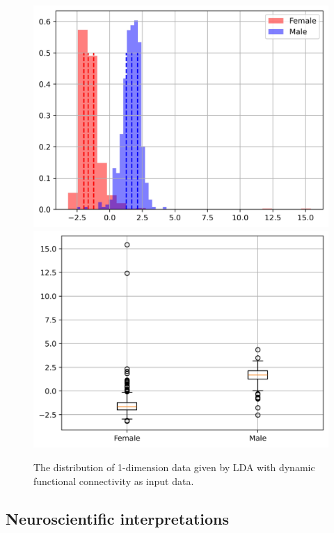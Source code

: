 \documentclass[11pt]{article}
\begin{document}
\begin{figure}[H]
{\begin{minipage}[b]{0.3\textwidth}
            \includegraphics[width=1\textwidth]{../Analysis/LDA/node=50_size=480_step=180_rho=0.1/hist.jpg}
            \includegraphics[width=1\textwidth]{../Analysis/LDA/node=50_size=480_step=180_rho=0.1/box.jpg}
        \end{minipage}
    }
    \caption{The distribution of 1-dimension data given by LDA with dynamic functional connectivity as input data.}
    \label{LDA-example-dfc}
\end{figure}

\subsection{Neuroscientiﬁc interpretations}
\end{document}
